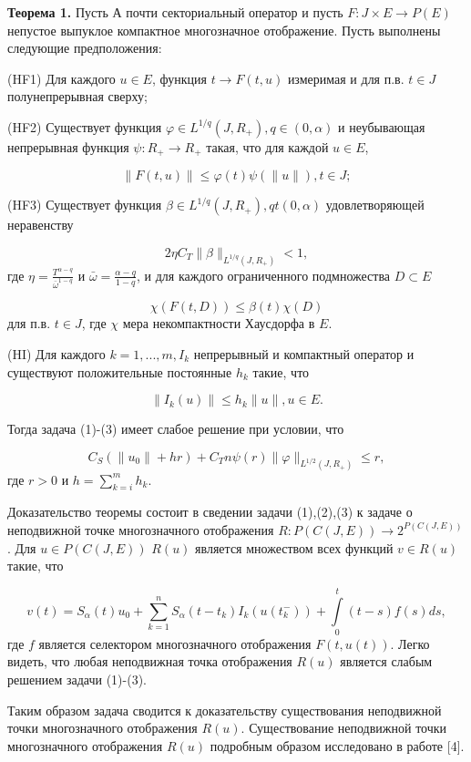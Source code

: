 \textbf{Теорема 1.} Пусть А почти секториальный оператор и пусть $F:J\times E\rightarrow P(E)$ непустое выпуклое компактное многозначное отображение. Пусть выполнены следующие предположения:

(HF1) Для каждого $u\in E$, функция $t\rightarrow F(t,u)$ измеримая и для п.в. $t\in J$ полунепрерывная сверху;

(HF2) Существует функция $\varphi\in L^{1/q}(J,R_{+}), q\in(0,\alpha)$ и неубывающая непрерывная функция $\psi:R_{+}\rightarrow R_{+}$ такая, что для каждой $u\in E$,

$$\|F(t,u)\|\leq\varphi(t)\psi(\|u\|), t\in J;$$

(HF3) Существует функция $\beta\in L^{1/q}(J,R_{+}), qt(0,\alpha)$ удовлетворяющей неравенству

$$2\eta C_{T}\|\beta\|_{L^{1/q}(J,R_{+})}<1,$$
где $\eta=\frac{T^{\alpha-q}}{\bar{\omega}^{1-q}}$ и $\bar{\omega}=\frac{\alpha-q}{1-q}$, и для каждого ограниченного подмножества $D\subset E$

$$\chi(F(t,D))\leq\beta(t)\chi(D)$$
для п.в. $t\in J$, где $\chi$ мера некомпактности Хаусдорфа в $E$.

(HI) Для каждого $k=1, ..., m, I_{k}$ непрерывный и компактный оператор и существуют положительные постоянные $h_{k}$ такие, что

$$\|I_{k}(u)\|\leq h_{k}\|u\|, u\in E.$$


Тогда задача (1)-(3) имеет слабое решение при условии, что

$$C_{S}(\|u_{0}\|+hr)+C_{T}n\psi(r)\|\varphi\|_{L^{1/2}(J,R_{+})}\leq r,$$
где $r>0$ и $h=\sum\limits_{k=i}^{m}h_{k}.$

Доказательство теоремы состоит в сведении задачи (1),(2),(3) к задаче о неподвижной точке многозначного отображения $R:P(C(J,E))\rightarrow 2^{P(C(J,E))}$. Для $u\in P(C(J,E))$ $R(u)$ является множеством всех функций $v\in R(u)$ такие, что

$$v(t)=S_{\alpha}(t)u_{0}+\sum\limits_{k=1}^{n}S_{\alpha}(t-t_{k})I_{k}(u(t_{k}^{-}))+\int\limits_{0}^{t}(t-s)f(s)ds,$$
где $f$ является селектором многозначного отображения $F(t,u(t))$. Легко видеть, что любая неподвижная точка отображения $R(u)$ является слабым решением задачи (1)-(3).

Таким образом задача сводится к доказательству существования неподвижной точки многозначного отображения $R(u)$. Существование неподвижной точки многозначного отображения $R(u)$ подробным образом исследовано в работе [4].











